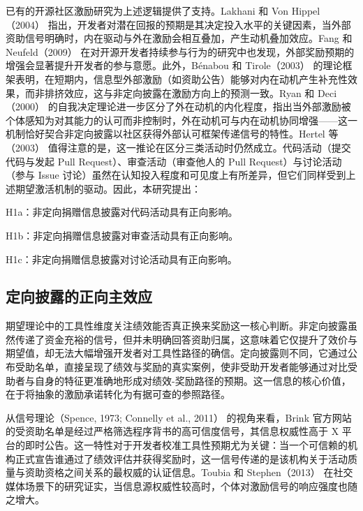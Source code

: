 \documentclass[
    type = master, %
    degree = professional,        %
    decl-page,  %
    twoside,                %
    fontset = fandol %
  ]{njuthesis}
\begin{document}
已有的开源社区激励研究为上述逻辑提供了支持。Lakhani 和 Von Hippel（2004）\cite{lakhani2003open} 指出，开发者对潜在回报的预期是其决定投入水平的关键因素，当外部资助信号明确时，内在驱动与外在激励会相互叠加，产生动机叠加效应。Fang 和 Neufeld（2009）\cite{fang2009understanding} 在对开源开发者持续参与行为的研究中也发现，外部奖励预期的增强会显著提升开发者的参与意愿。此外，B\'{e}nabou 和 Tirole（2003）\cite{benabou2003intrinsic} 的理论框架表明，在短期内，信息型外部激励（如资助公告）能够对内在动机产生补充性效果，而非排挤效应，这与非定向披露在激励方向上的预测一致。Ryan 和 Deci（2000）\cite{ryan2000self} 的自我决定理论进一步区分了外在动机的内化程度，指出当外部激励被个体感知为对其能力的认可而非控制时，外在动机可与内在动机协同增强——这一机制恰好契合非定向披露以社区获得外部认可框架传递信号的特性。Hertel 等（2003）\cite{hertel2003motivation}
值得注意的是，这一推论在区分三类活动时仍然成立。代码活动（提交代码与发起 Pull Request）、审查活动（审查他人的 Pull Request）与讨论活动（参与 Issue 讨论）虽然在认知投入程度和可见度上有所差异，但它们同样受到上述期望激活机制的驱动。因此，本研究提出：

H1a：非定向捐赠信息披露对代码活动具有正向影响。

H1b：非定向捐赠信息披露对审查活动具有正向影响。

H1c：非定向捐赠信息披露对讨论活动具有正向影响。

\subsection{定向披露的正向主效应}

期望理论中的工具性维度关注绩效能否真正换来奖励这一核心判断。非定向披露虽然传递了资金充裕的信号，但并未明确回答资助归属，这意味着它仅提升了效价与期望值，却无法大幅增强开发者对工具性路径的确信。定向披露则不同，它通过公布受助名单，直接呈现了绩效与奖励的真实案例，使非受助开发者能够通过对比受助者与自身的特征更准确地形成对绩效-奖励路径的预期。这一信息的核心价值，在于将抽象的激励承诺转化为有据可查的参照路径。

从信号理论（Spence, 1973; Connelly et al., 2011）\cite{spence1973job,connelly2011signaling} 的视角来看，Brink 官方网站的受资助名单是经过严格筛选程序背书的高可信度信号，其信息权威性高于 X 平台的即时公告。这一特性对于开发者校准工具性预期尤为关键：当一个可信赖的机构正式宣告谁通过了绩效评估并获得奖励时，这一信号传递的是该机构关于活动质量与资助资格之间关系的最权威的认证信息。Toubia 和 Stephen（2013）\cite{toubia2013intrinsic} 在社交媒体场景下的研究证实，当信息源权威性较高时，个体对激励信号的响应强度也随之增大。
\end{document}
